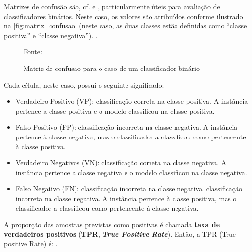 Matrizes de confusão são, cf.  e , particularmente úteis para avaliação de classificadores binários. Neste caso, os valores são atribuídos conforme ilustrado na \autoref{fig:matriz_confusao} (neste caso, as duas classes estão definidas como ``classe positiva'' e ``classe negativa''). \cite{hossin_review_2015}.

\begin{figure}[h!]
	\centering
	\caption{Matriz de confusão para o caso de um classificador binário}
	
	{\scriptsize Fonte: }
	\label{fig:binario_matriz_confusao}
\end{figure}

Cada célula, neste caso, possui o seguinte significado:

\begin{itemize}
	\item Verdadeiro Positivo (VP): classificação correta na classe positiva. A instância pertence a classe positiva e o modelo classificou na classe positiva.
	\item Falso Positivo (FP): classificação incorreta na classe negativa. A instância pertence à classe negativa, mas o classificador a classificou como pertencente à classe positiva.
	\item Verdadeiro Negativos (VN): classificação correta na classe negativa. A instância pertence a classe negativa e o modelo classificou na classe negativa.
	\item Falso Negativo (FN): classificação incorreta na classe negativa. classificação incorreta na classe negativa. A instância pertence à classe positiva, mas o classificador a classificou como pertencente à classe negativa. 
\end{itemize}

A proporção das amostras previstas como positivas é chamada \textbf{taxa de verdadeiros positivos} (\textbf{TPR}, \textit{\textbf{True Positive Rate}}). Então, a TPR (True positive Rate) é: \cite{klosterman_projetos_2020} \cite{hossin_review_2015}.

